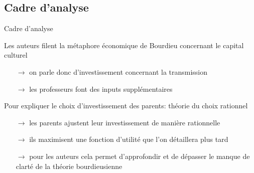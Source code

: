 \documentclass[9pt]{beamer}
\begin{document}
\subsection{Cadre d'analyse}
\begin{frame}{Cadre d'analyse}
	\begin{block}{Les auteurs filent la métaphore économique de Bourdieu concernant le capital culturel}
		\begin{itemize}
		\item[$\to$] on parle donc d'\og investissement \fg{} concernant la transmission
		\item[$\to$] les professeurs font des \og inputs \fg{} supplémentaires
		\end{itemize}
	\end{block}
	\begin{block}{Pour expliquer le choix d'investissement des parents: théorie du choix rationnel}
		\begin{itemize}
		\item[$\to$] les parents ajustent leur investissement de manière rationnelle
		\item[$\to$] ils maximisent une fonction d'utilité que l'on détaillera plus tard
		\item[$\to$] pour les auteurs cela permet d'approfondir et de dépasser le manque de clarté de la théorie bourdieusienne
		\end{itemize}
	\end{block}
\end{frame}
\end{document}
